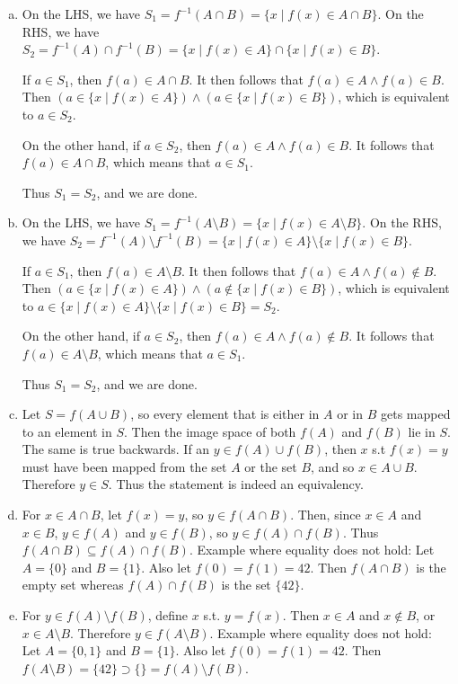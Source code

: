 \begin{enumerate}
\begin{enumerate}[(a)]
        \item On the LHS, we have $S_1=f^{-1}(A\cap B)=\{x\mid f(x)\in A\cap B\}$. On the RHS, we have $S_2=f^{-1}(A)\cap f^{-1}(B)=\{x\mid f(x)\in A\}\cap\{x\mid f(x)\in B\}$.
        
        If $a\in S_1$, then $f(a)\in A\cap B$. It then follows that $f(a)\in A \wedge f(a)\in B$. Then $(a\in\{x\mid f(x)\in A\})\wedge (a\in\{x\mid f(x)\in B\})$, which is equivalent to $a\in S_2$.
        
        On the other hand, if $a\in S_2$, then $f(a)\in A \wedge f(a)\in B$. It follows that $f(a)\in A\cap B$, which means that $a\in S_1$.
        
        Thus $S_1=S_2$, and we are done.
        
        \item On the LHS, we have $S_1=f^{-1}(A\setminus B)=\{x\mid f(x)\in A\setminus B\}$. On the RHS, we have $S_2=f^{-1}(A)\setminus f^{-1}(B)=\{x\mid f(x)\in A\}\setminus\{x\mid f(x)\in B\}$.
        
        If $a\in S_1$, then $f(a)\in A\setminus B$. It then follows that $f(a)\in A \wedge f(a)\notin B$. Then $(a\in\{x\mid f(x)\in A\})\wedge(a\notin\{x\mid f(x)\in B\})$, which is equivalent to $a\in\{x\mid f(x)\in A\}\setminus\{x\mid f(x)\in B\}= S_2$.
        
        On the other hand, if $a\in S_2$, then $f(a)\in A \wedge f(a)\notin B$. It follows that $f(a)\in A\setminus B$, which means that $a\in S_1$.
        
        Thus $S_1=S_2$, and we are done.
        
        \item Let $S=f(A\cup B)$, so every element that is either in $A$ or in $B$ gets mapped to an element in $S$. Then the image space of both $f(A)$ and $f(B)$ lie in $S$. The same is true backwards. If an $y\in f(A)\cup f(B)$, then $x$ s.t $f(x)=y$ must have been mapped from the set $A$ or the set $B$, and so $x\in A\cup B$. Therefore $y\in S$. Thus the statement is indeed an equivalency.
        
        \item For $x\in A\cap B$, let $f(x)=y$, so $y\in f(A\cap B)$. Then, since $x\in A$ and $x\in B$, $y\in f(A)$ and $y\in f(B)$, so $y\in f(A)\cap f(B)$. Thus $f(A\cap B) \subseteq f(A)\cap f(B)$. Example where equality does not hold: Let $A=\{0\}$ and $B=\{1\}$. Also let $f(0)=f(1)=42$. Then $f(A\cap B)$ is the empty set whereas $f(A)\cap f(B)$ is the set $\{42\}$.
        
        \item For $y\in f(A)\setminus f(B)$, define $x$ s.t. $y=f(x)$. Then $x\in A$ and $x\notin B$, or $x\in A\setminus B$. Therefore $y\in f(A\setminus B)$. Example where equality does not hold: Let $A=\{0, 1\}$ and $B=\{1\}$. Also let $f(0)=f(1)=42$. Then $f(A\setminus B)=\{42\}\supset\{ \}=f(A)\setminus f(B)$. 
    \end{enumerate}
\end{enumerate}